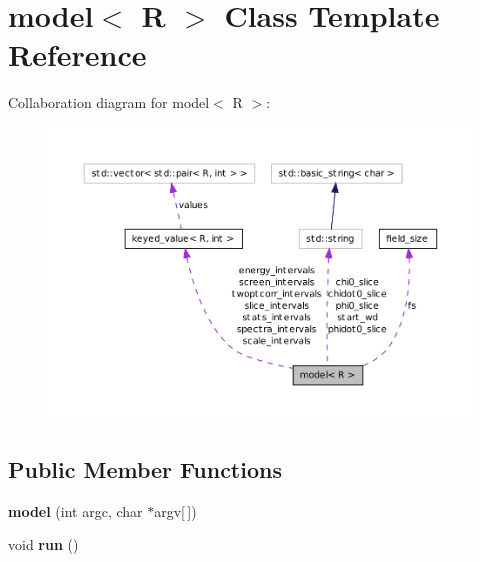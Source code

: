 \hypertarget{classmodel}{
\section{model$<$ R $>$ Class Template Reference}
\label{classmodel}
}


Collaboration diagram for model$<$ R $>$:
\nopagebreak
\begin{figure}[H]
\begin{center}
\leavevmode
\includegraphics[width=400pt]{classmodel__coll__graph}
\end{center}
\end{figure}
\subsection*{Public Member Functions}
\begin{DoxyCompactItemize}
\item 
\hypertarget{classmodel_a1a3966e2e1ce020c9db63b11b21af282}{
{\bfseries model} (int argc, char $\ast$argv\mbox{[}$\,$\mbox{]})}
\label{classmodel_a1a3966e2e1ce020c9db63b11b21af282}

\item 
\hypertarget{classmodel_abaace1e276e1eb6010eb68049725d61d}{
void {\bfseries run} ()}
\label{classmodel_abaace1e276e1eb6010eb68049725d61d}

\end{DoxyCompactItemize}
